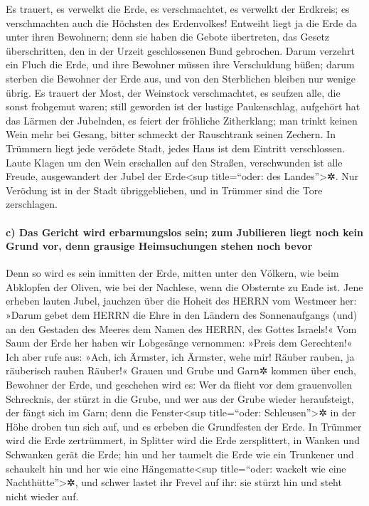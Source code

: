 Es trauert, es verwelkt die Erde, es verschmachtet, es
verwelkt der Erdkreis; es verschmachten auch die Höchsten des
Erdenvolkes! Entweiht liegt ja die Erde da unter ihren
Bewohnern; denn sie haben die Gebote übertreten, das Gesetz
überschritten, den in der Urzeit geschlossenen Bund gebrochen.
Darum verzehrt ein Fluch die Erde, und ihre Bewohner
müssen ihre Verschuldung büßen; darum sterben die Bewohner der Erde aus,
und von den Sterblichen bleiben nur wenige übrig. Es
trauert der Most, der Weinstock verschmachtet, es seufzen alle, die
sonst frohgemut waren; still geworden ist der lustige
Paukenschlag, aufgehört hat das Lärmen der Jubelnden, es feiert der
fröhliche Zitherklang; man trinkt keinen Wein mehr bei
Gesang, bitter schmeckt der Rauschtrank seinen Zechern.
In Trümmern liegt jede verödete Stadt, jedes Haus ist dem
Eintritt verschlossen. Laute Klagen um den Wein
erschallen auf den Straßen, verschwunden ist alle Freude, ausgewandert
der Jubel der Erde\textless sup title=``oder: des Landes''\textgreater✲.
Nur Verödung ist in der Stadt übriggeblieben, und in
Trümmer sind die Tore zerschlagen.

\hypertarget{c-das-gericht-wird-erbarmungslos-sein-zum-jubilieren-liegt-noch-kein-grund-vor-denn-grausige-heimsuchungen-stehen-noch-bevor}{%
\paragraph{c) Das Gericht wird erbarmungslos sein; zum Jubilieren liegt
noch kein Grund vor, denn grausige Heimsuchungen stehen noch
bevor}\label{c-das-gericht-wird-erbarmungslos-sein-zum-jubilieren-liegt-noch-kein-grund-vor-denn-grausige-heimsuchungen-stehen-noch-bevor}}

Denn so wird es sein inmitten der Erde, mitten unter den
Völkern, wie beim Abklopfen der Oliven, wie bei der Nachlese, wenn die
Obsternte zu Ende ist. Jene erheben lauten Jubel,
jauchzen über die Hoheit des HERRN vom Westmeer her:
»Darum gebet dem HERRN die Ehre in den Ländern des
Sonnenaufgangs (und) an den Gestaden des Meeres dem Namen des HERRN, des
Gottes Israels!« Vom Saum der Erde her haben wir
Lobgesänge vernommen: »Preis dem Gerechten!« Ich aber rufe aus: »Ach,
ich Ärmster, ich Ärmster, wehe mir! Räuber rauben, ja räuberisch rauben
Räuber!« Grauen und Grube und Garn✲ kommen über euch,
Bewohner der Erde, und geschehen wird es: Wer da flieht
vor dem grauenvollen Schrecknis, der stürzt in die Grube, und wer aus
der Grube wieder heraufsteigt, der fängt sich im Garn; denn die
Fenster\textless sup title=``oder: Schleusen''\textgreater✲ in der Höhe
droben tun sich auf, und es erbeben die Grundfesten der Erde.
In Trümmer wird die Erde zertrümmert, in Splitter wird
die Erde zersplittert, in Wanken und Schwanken gerät die Erde;
hin und her taumelt die Erde wie ein Trunkener und
schaukelt hin und her wie eine Hängematte\textless sup title=``oder:
wackelt wie eine Nachthütte''\textgreater✲, und schwer lastet ihr Frevel
auf ihr: sie stürzt hin und steht nicht wieder auf.

